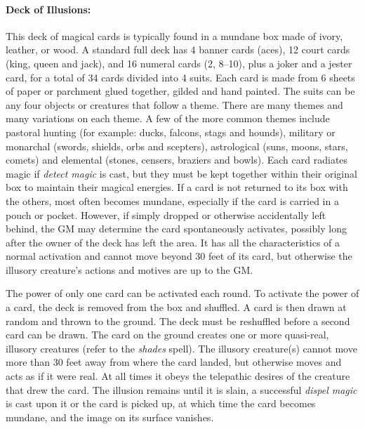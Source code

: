 \begin{multicols}{2}
\paragraph{Deck of Illusions:} This deck of magical cards is typically found in a mundane box made of ivory, leather, or wood.  A standard full deck has 4 banner cards (aces), 12 court cards (king, queen and jack), and 16 numeral cards (2, 8--10), plus a joker and a jester card, for a total of 34 cards divided into 4 suits.  Each card is made from 6 sheets of paper or parchment glued together, gilded and hand painted.  The suits can be any four objects or creatures that follow a theme.  There are many themes and many variations on each theme.  A few of the more common themes include pastoral hunting (for example: ducks, falcons, stags and hounds), military or monarchal (swords, shields, orbs and scepters), astrological (suns, moons, stars, comets) and elemental (stones, censers, braziers and bowls).  Each card radiates magic if \textit{detect magic} is cast, but they must be kept together within their original box to maintain their magical energies.  If a card is not returned to its box with the others, most often becomes mundane, especially if the card is carried in a pouch or pocket. However, if simply dropped or otherwise accidentally left behind, the GM may determine the card spontaneously activates, possibly long after the owner of the deck has left the area.  It has all the characteristics of a normal activation and cannot move beyond 30 feet of its card, but otherwise the illusory creature's actions and motives are up to the GM.

The power of only one card can be activated each round.  To activate the power of a card, the deck is removed from the box and shuffled.  A card is then drawn at random and thrown to the ground.  The deck must be reshuffled before a second card can be drawn.  The card on the ground creates one or more quasi-real, illusory creatures (refer to the \textit{shades} spell).  The illusory creature(s) cannot move more than 30 feet away from where the card landed, but otherwise moves and acts as if it were real.  At all times it obeys the telepathic desires of the creature that drew the card.  The illusion remains until it is slain, a successful \textit{dispel magic} is cast upon it or the card is picked up, at which time the card becomes mundane, and the image on its surface vanishes. 

\end{multicols}

